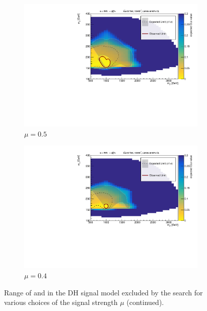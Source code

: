  \begin{figure} \ContinuedFloat
  \begin{subfigure}{0.48\textwidth}
    \includegraphics[width=\textwidth]{Figures/App_signal_strength/unblinded_mu0_5_nosig.pdf}
    \caption{\(\mu=0.5\)}\label{fig:unblinded_0.5}
  \end{subfigure} \hspace{0.3em}
  \begin{subfigure}{0.48\textwidth}
    \includegraphics[width=\textwidth]{Figures/App_signal_strength/unblinded_mu0_4_nosig.pdf}
    \caption{\(\mu=0.4\)}\label{fig:unblinded_0.4}
  \end{subfigure} \vspace{1em}  
  \caption[]{Range of \ms and \mZp in the DH signal model excluded by the search for various choices of the signal strength \(\mu\) (continued).}
\end{figure}